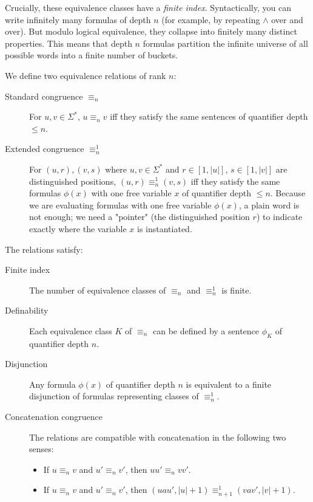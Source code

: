 Crucially, these equivalence classes have a \emph{finite index}. Syntactically, you can write infinitely many formulas of depth $n$ (for example, by repeating $\land$ over and over). But modulo logical equivalence, they collapse into finitely many distinct properties. This means that depth $n$ formulas partition the infinite universe of all possible words into a finite number of buckets.

We define two equivalence relations of rank $n$:
\begin{description}
    \item[Standard congruence $\equiv_n$] For $u, v \in \Sigma^*$, $u \equiv_n v$ iff they satisfy the same sentences of quantifier depth $\le n$.
    \item[Extended congruence $\equiv_n^1$] For $(u, r), (v, s)$ where $u,v \in \Sigma^*$ and $r \in [1, |u|]$, $s \in [1, |v|]$ are distinguished positions, $(u, r) \equiv_n^1 (v, s)$ iff they satisfy the same formulas $\phi(x)$ with one free variable $x$ of quantifier depth $\le n$. Because we are evaluating formulas with one free variable $\phi(x)$, a plain word is not enough; we need a "pointer" (the distinguished position $r$) to indicate exactly where the variable $x$ is instantiated.
\end{description}

\begin{lemma}
The relations satisfy:
\begin{description}
    \item[Finite index] The number of equivalence classes of $\equiv_n$ and $\equiv_n^1$ is finite.
    \item[Definability] Each equivalence class $K$ of $\equiv_n$ can be defined by a sentence $\phi_K$ of quantifier depth $n$.
    \item[Disjunction] Any formula $\phi(x)$ of quantifier depth $n$ is equivalent to a finite disjunction of formulas representing classes of $\equiv_n^1$.
    \item[Concatenation congruence] The relations are compatible with concatenation in the following two senses:
    \begin{itemize}
        \item If $u \equiv_n v$ and $u' \equiv_n v'$, then $u u' \equiv_n v v'$.
        \item If $u \equiv_n v$ and $u' \equiv_n v'$, then $(u a u', |u|+1) \equiv_{n+1}^1 (v a v', |v|+1)$.
    \end{itemize}
\end{description}
\end{lemma}

